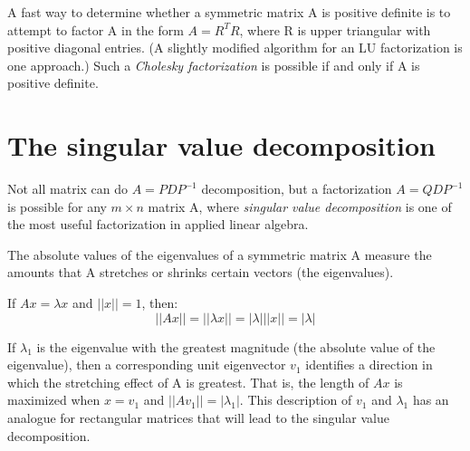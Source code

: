 \begin{note}
    A fast way to determine whether a symmetric matrix A is positive definite is to attempt to factor A in the form \(A = R^TR\), where R is upper triangular with positive diagonal entries. 
    (A slightly modified algorithm for an LU factorization is one approach.)
    Such a \textit{Cholesky factorization} is possible if and only if A is positive definite.
\end{note}

\section{The singular value decomposition}

Not all matrix can do \(A = PDP^{-1}\) decomposition, but a factorization \(A = QDP^{-1}\) is possible for any \(m \times n\) matrix A,
where \textit{singular value decomposition} is one of the most useful factorization in applied linear algebra. 

The absolute values of the eigenvalues of a symmetric matrix A measure the amounts that A stretches or shrinks certain vectors (the eigenvalues).

If \(Ax = \lambda x\) and  \(||x|| = 1\), then:
\[
    ||Ax|| = ||\lambda x|| = |\lambda| ||x|| = |\lambda|
\]

If \(\lambda_1\) is the eigenvalue with the greatest magnitude (the absolute value of the eigenvalue), then a corresponding unit eigenvector \(v_1\) identifies a direction in which the stretching effect of A is greatest. That is, the length of \(Ax\) is maximized when \(x = v_1\) and \(||Av_1|| = |\lambda_1|\). This description of \(v_1\) and \(\lambda_1\) has an analogue for rectangular matrices that will lead to the singular value decomposition.    

